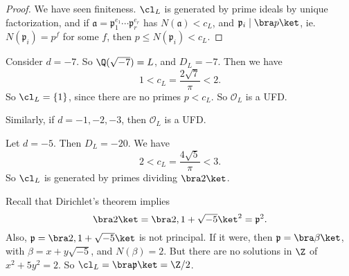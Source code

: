 \documentclass[a4paper]{article}
\begin{document}
\begin{proof}
  We have seen finiteness. $\cl_L$ is generated by prime ideals by unique factorization, and if $\mathfrak{a} = \mathfrak{p}_1^{e_1} \cdots \mathfrak{p}_r^{e_r}$ has $N(\mathfrak{a}) < c_L$, and $\mathfrak{p}_i \mid \bra p\ket$, ie. $N(\mathfrak{p}_i) = p^f$ for some $f$, then $p \leq N(\mathfrak{p}_i) < c_L$.
\end{proof}

\begin{eg}
  Consider $d = -7$. So $\Q(\sqrt{-7}) = L$, and $D_L = -7$. Then we have
  \[
    1 < c_L = \frac{2\sqrt{7}}{\pi} < 2.
  \]
  So $\cl_L = \{1\}$, since there are no primes $p < c_L$. So $\mathcal{O}_L$ is a UFD.

  Similarly, if $d = -1, -2, -3$, then $\mathcal{O}_L$ is a UFD.
\end{eg}

\begin{eg}
  Let $d = -5$. Then $D_L = -20$. We have
  \[
    2 < c_L = \frac{4\sqrt{5}}{\pi} < 3.
  \]
  So $\cl_L$ is generated by primes dividing $\bra 2\ket$.

  Recall that Dirichlet's theorem implies
  \[
    \bra 2\ket = \bra 2, 1 + \sqrt{-5}\ket^2 = \mathfrak{p}^2.
  \]
  Also, $\mathfrak{p} = \bra 2, 1 + \sqrt{-5}\ket$ is not principal. If it were, then $\mathfrak{p} = \bra \beta\ket$, with $\beta = x + y \sqrt{-5}$, and $N(\beta) = 2$. But there are no solutions in $\Z$ of $x^2 + 5y^2 = 2$. So $\cl_L = \bra \mathfrak{p}\ket = \Z/2$.
\end{eg}
\end{document}

